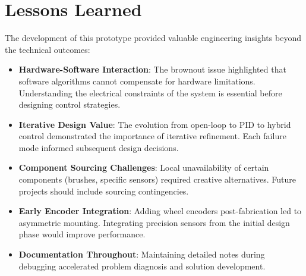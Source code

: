 \section{Lessons Learned}
\label{sec:lessons_learned}
The development of this prototype provided valuable engineering insights beyond the technical outcomes:
\begin{itemize}
    \item \textbf{Hardware-Software Interaction}: The brownout issue highlighted that software algorithms cannot compensate for hardware limitations. Understanding the electrical constraints of the system is essential before designing control strategies.
    \item \textbf{Iterative Design Value}: The evolution from open-loop to PID to hybrid control demonstrated the importance of iterative refinement. Each failure mode informed subsequent design decisions.
    \item \textbf{Component Sourcing Challenges}: Local unavailability of certain components (brushes, specific sensors) required creative alternatives. Future projects should include sourcing contingencies.
    \item \textbf{Early Encoder Integration}: Adding wheel encoders post-fabrication led to asymmetric mounting. Integrating precision sensors from the initial design phase would improve performance.
    \item \textbf{Documentation Throughout}: Maintaining detailed notes during debugging accelerated problem diagnosis and solution development.
\end{itemize}

